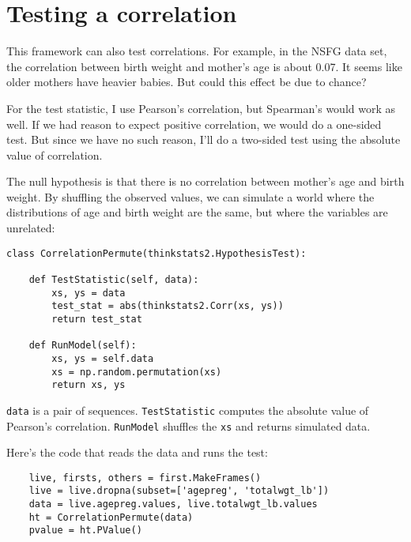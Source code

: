 \section{Testing a correlation}
\label{corrtest}

This framework can also test correlations.  For example, in the NSFG
data set, the correlation between birth weight and mother's age is
about 0.07.  It seems like older mothers have heavier babies.  But
could this effect be due to chance?

For the test statistic, I use
Pearson's correlation, but Spearman's would work as well.
If we had reason to expect positive correlation, we would do a
one-sided test.  But since we have no such reason, I'll
do a two-sided test using the absolute value of correlation.

The null hypothesis is that there is no correlation between mother's
age and birth weight.  By shuffling the observed values, we can
simulate a world where the distributions of age and
birth weight are the same, but where the variables are unrelated:

\begin{verbatim}
class CorrelationPermute(thinkstats2.HypothesisTest):

    def TestStatistic(self, data):
        xs, ys = data
        test_stat = abs(thinkstats2.Corr(xs, ys))
        return test_stat

    def RunModel(self):
        xs, ys = self.data
        xs = np.random.permutation(xs)
        return xs, ys
\end{verbatim}

{\tt data} is a pair of sequences.  {\tt TestStatistic} computes the
absolute value of Pearson's correlation.  {\tt RunModel} shuffles the
{\tt xs} and returns simulated data.

Here's the code that reads the data and runs the test:

\begin{verbatim}
    live, firsts, others = first.MakeFrames()
    live = live.dropna(subset=['agepreg', 'totalwgt_lb'])
    data = live.agepreg.values, live.totalwgt_lb.values
    ht = CorrelationPermute(data)
    pvalue = ht.PValue()
\end{verbatim}

